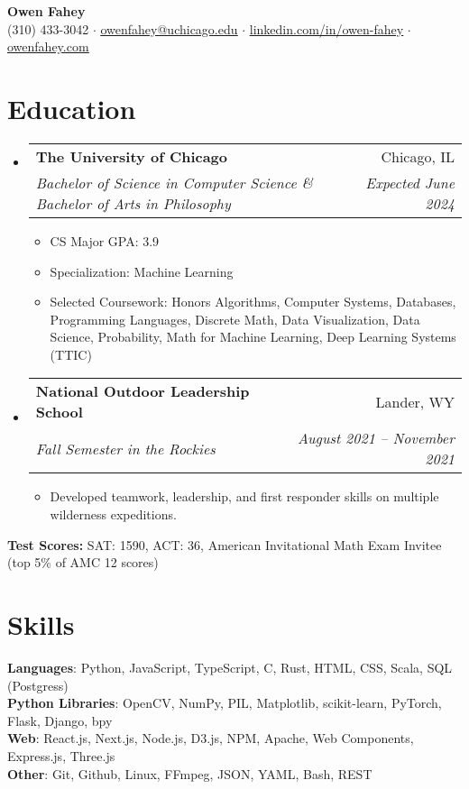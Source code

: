 \documentclass[letterpaper,11pt]{article}
\makeatletter
\newcommand{\resumeItem}[1]{
  \item\small{
    {#1 \vspace{-2pt}}
  }
}
\newcommand{\resumeSubheading}[4]{
  \vspace{-2pt}\item
    \begin{tabular*}{0.97\textwidth}[t]{l@{\extracolsep{\fill}}r}
      \textbf{#1} & #2 \\
      \textit{\small#3} & \textit{\small #4} \\
    \end{tabular*}\vspace{-7pt}
}
\newcommand{\resumeSubHeadingListStart}{\begin{itemize}[leftmargin=0.125in, label={}]}
\newcommand{\resumeSubHeadingListEnd}{\end{itemize}}
\newcommand{\resumeItemListStart}{\begin{itemize}[leftmargin=0.185in]
}
\newcommand{\resumeItemListEnd}{\end{itemize}\vspace{-5pt}}
\makeatother
\begin{document}
\begin{center}

  \textbf{\Huge 
Owen Fahey} \\
  \small (310) 433-3042 $\cdot$
  \href{mailto:owenfahey@uchicago.edu}{\underline{owenfahey@uchicago.edu}} $\cdot$
  \href{https://www.linkedin.com/in/owen-fahey}{\underline{linkedin.com/in/owen-fahey}} $\cdot$
  \href{https://owenfahey.com}{\underline{owenfahey.com}}
\end{center}

\section{Education}
  \resumeSubHeadingListStart
    \resumeSubheading
      {The University of Chicago}{Chicago, IL}
      {Bachelor of Science in Computer Science \& Bachelor of Arts in Philosophy}{Expected June 2024}
      \resumeItemListStart
        \resumeItem{CS Major GPA: 3.9}
        \resumeItem {Specialization: Machine Learning}
        \resumeItem{{Selected Coursework:} Honors Algorithms, Computer Systems, Databases, Programming Languages, Discrete Math, Data Visualization, Data Science, Probability, Math for Machine Learning, Deep Learning Systems (TTIC)}
      \resumeItemListEnd
    \resumeSubheading
      {National Outdoor Leadership School}{Lander, WY}
      {Fall Semester in the Rockies}{August 2021 -- November 2021}
      \resumeItemListStart
        \resumeItem{Developed teamwork, leadership, and first responder skills on multiple wilderness expeditions.}
      \resumeItemListEnd
  \resumeSubHeadingListEnd
  {
    \vspace{-4pt}
    \noindent\hspace{0.15in}\small\textbf{Test Scores:} SAT: 1590, ACT: 36, American Invitational Math Exam Invitee (top 5\% of AMC 12 scores)
    \vspace{-5pt}
    }
\section{Skills}
  \begin{itemize}[leftmargin=0.15in, label={}]
    \small{\item{
      \textbf{Languages}{: Python, JavaScript, TypeScript, C, Rust, HTML, CSS, Scala, SQL (Postgress)} \\
      \textbf{Python Libraries}{: OpenCV, NumPy, PIL, Matplotlib, scikit-learn, PyTorch, Flask, Django, bpy} \\
      \textbf{Web}{: React.js, Next.js, Node.js, D3.js, NPM, Apache, Web Components, Express.js, Three.js} \\
      \textbf{Other}{: Git, Github, Linux, FFmpeg, JSON, YAML, Bash, REST}}}
      {\vspace{-5pt}}
  \end{itemize}
  
\end{document}

